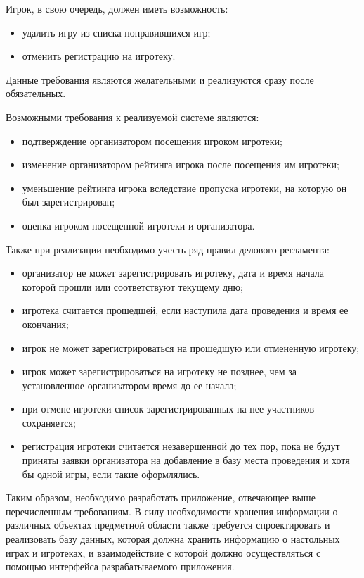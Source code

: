 \clearpage
Игрок, в свою очередь, должен иметь возможность:
\begin{itemize}
    \item удалить игру из списка понравившихся игр;
    \item отменить регистрацию на игротеку.
\end{itemize}

Данные требования являются желательными и реализуются сразу после обязательных.
 
Возможными требования к реализуемой системе являются:
\begin{itemize}
    \item подтверждение организатором посещения игроком игротеки;
    \item изменение организатором рейтинга игрока после посещения им игротеки;
    \item уменьшение рейтинга игрока вследствие пропуска игротеки, на которую он
        был зарегистрирован;
    \item оценка игроком посещенной игротеки и организатора.
\end{itemize}

Также при реализации необходимо учесть ряд правил делового регламента:
\begin{itemize}
    \item организатор не может зарегистрировать игротеку, дата и время начала
        которой прошли или соответствуют текущему дню;
    \item игротека считается прошедшей, если наступила дата проведения и время
        ее окончания;
    \item игрок не может зарегистрироваться на прошедшую или отмененную
        игротеку;
    \item игрок может зарегистрироваться на игротеку не позднее, чем за
        установленное организатором время до ее начала;
    \item при отмене игротеки список зарегистрированных на нее участников
        сохраняется;
    \item регистрация игротеки считается незавершенной до тех пор, пока не будут
        приняты заявки организатора на добавление в базу места проведения и хотя
        бы одной игры, если такие оформлялись.
\end{itemize}

Таким образом, необходимо разработать приложение, отвечающее выше перечисленным
требованиям. В силу необходимости хранения информации о различных объектах
предметной области также требуется спроектировать и реализовать базу данных,
которая должна хранить информацию о настольных играх и игротеках, и
взаимодействие с которой должно осуществляться с помощью интерфейса
разрабатываемого приложения.

